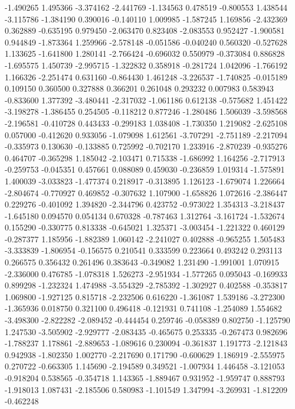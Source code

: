 -1.490265
1.495366
-3.374162
-2.441769
-1.134563
0.478519
-0.800553
1.438544
-3.115786
-1.384190
0.390016
-0.140110
1.009985
-1.587245
1.169856
-2.432369
0.362889
-0.635195
0.979450
-2.063470
0.823408
-2.083553
0.952427
-1.900581
0.944849
-1.873364
1.259966
-2.578148
-0.051586
-0.040240
0.560320
-0.527628
1.133625
-1.641800
1.280141
-2.766424
-0.696032
0.550979
-0.373084
0.886828
-1.695575
1.450739
-2.995715
-1.322832
0.358918
-0.281724
1.042096
-1.766192
1.166326
-2.251474
0.631160
-0.864430
1.461248
-3.226537
-1.740825
-0.015189
0.109150
0.360500
0.327888
0.366201
0.261048
0.293232
0.007983
0.583943
-0.833600
1.377392
-3.480441
-2.317032
-1.061186
0.612138
-0.575682
1.451422
-3.198278
-1.386455
0.254505
-0.118212
0.877246
-1.280486
1.506039
-3.598568
-2.196581
-0.410728
0.443433
-0.299183
1.038408
-1.730350
1.219082
-2.625108
0.057000
-0.412620
0.933056
-1.079098
1.612561
-3.707291
-2.751189
-2.217094
-0.335973
0.130630
-0.133885
0.725992
-0.702170
1.233916
-2.870239
-0.935276
0.464707
-0.365298
1.185042
-2.103471
0.715338
-1.686992
1.164256
-2.717913
-0.259753
-0.045351
0.457661
0.088089
0.459030
-0.236859
1.019314
-1.575891
1.400039
-3.033823
-1.477374
0.218917
-0.313895
1.126123
-1.679074
1.226664
-2.804674
-0.770927
0.469852
-0.307632
1.107900
-1.658826
1.072616
-2.386447
0.229276
-0.401092
1.394820
-2.344796
0.423752
-0.973022
1.354313
-3.218437
-1.645180
0.094570
0.054134
0.670328
-0.787463
1.312764
-3.161724
-1.532674
0.155290
-0.330775
0.813338
-0.645021
1.325371
-3.003454
-1.221322
0.460129
-0.287377
1.185956
-1.882389
1.060142
-2.241027
0.402888
-0.965255
1.505483
-3.333839
-1.806954
-0.156575
0.210541
0.333599
0.223664
0.493242
0.293113
0.266575
0.356432
0.261496
0.383643
-0.349082
1.231490
-1.991001
1.070915
-2.336000
0.476785
-1.078318
1.526273
-2.951934
-1.577265
0.095043
-0.169933
0.899298
-1.232324
1.474988
-3.554329
-2.785392
-1.302927
0.402588
-0.353817
1.069800
-1.927125
0.815718
-2.232506
0.616220
-1.361087
1.539186
-3.272300
-1.365936
0.018750
0.321100
0.496418
-0.121931
0.741108
-1.254089
1.554682
-3.498300
-2.822282
-2.089452
-0.444454
0.259746
-0.058389
0.802750
-1.125790
1.247530
-3.505902
-2.929777
-2.083435
-0.465675
0.253335
-0.267473
0.982696
-1.788237
1.178861
-2.889653
-1.089616
0.230094
-0.361837
1.191773
-2.121843
0.942938
-1.802350
1.002770
-2.217690
0.171790
-0.600629
1.186919
-2.555975
0.270722
-0.663305
1.145690
-2.194589
0.349521
-1.007934
1.446458
-3.121053
-0.918204
0.538565
-0.354718
1.143365
-1.889467
0.931952
-1.959747
0.888793
-1.918013
1.087431
-2.185506
0.580983
-1.101549
1.347994
-3.269931
-1.812209
-0.462248
